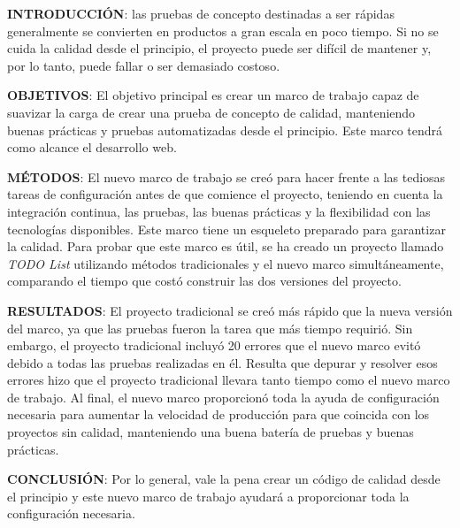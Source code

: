 \textbf{INTRODUCCIÓN}: las pruebas de concepto destinadas a ser rápidas generalmente se convierten en productos a gran escala en poco tiempo. Si no se cuida la calidad desde el principio, el proyecto puede ser difícil de mantener y, por lo tanto, puede fallar o ser demasiado costoso.

\textbf{OBJETIVOS}: El objetivo principal es crear un marco de trabajo capaz de suavizar la carga de crear una prueba de concepto de calidad, manteniendo buenas prácticas y pruebas automatizadas desde el principio. Este marco tendrá como alcance el desarrollo web.

\textbf{MÉTODOS}: El nuevo marco de trabajo se creó para hacer frente a las tediosas tareas de configuración antes de que comience el proyecto, teniendo en cuenta la integración continua, las pruebas, las buenas prácticas y la flexibilidad con las tecnologías disponibles. Este marco tiene un esqueleto preparado para garantizar la calidad. Para probar que este marco es útil, se ha creado un proyecto llamado \textit{TODO List} utilizando métodos tradicionales y el nuevo marco simultáneamente, comparando el tiempo que costó construir las dos versiones del proyecto.

\textbf{RESULTADOS}: El proyecto tradicional se creó más rápido que la nueva versión del marco, ya que las pruebas fueron la tarea que más tiempo requirió. Sin embargo, el proyecto tradicional incluyó 20 errores que el nuevo marco evitó debido a todas las pruebas realizadas en él. Resulta que depurar y resolver esos errores hizo que el proyecto tradicional llevara tanto tiempo como el nuevo marco de trabajo. Al final, el nuevo marco proporcionó toda la ayuda de configuración necesaria para aumentar la velocidad de producción para que coincida con los proyectos sin calidad, manteniendo una buena batería de pruebas y buenas prácticas.

\textbf{CONCLUSIÓN}: Por lo general, vale la pena crear un código de calidad desde el principio y este nuevo marco de trabajo ayudará a proporcionar toda la configuración necesaria.

